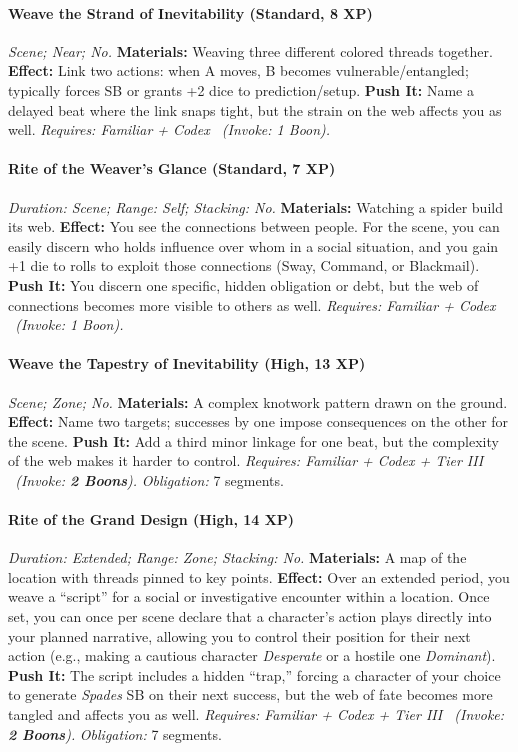 \paragraph{Weave the Strand of Inevitability (Standard, 8 XP)} \emph{Scene; Near; No.}
\textbf{Materials:} Weaving three different colored threads together.
\textbf{Effect:} Link two actions: when A moves, B becomes vulnerable/entangled; typically forces SB or grants +2 dice to prediction/setup.
\textbf{Push It:} Name a delayed beat where the link snaps tight, but the strain on the web affects you as well.
\emph{Requires: Familiar + Codex \ (\textit{Invoke:} 1 Boon).}
\paragraph{Rite of the Weaver's Glance (Standard, 7 XP)} \emph{Duration: Scene; Range: Self; Stacking: No.}
\textbf{Materials:} Watching a spider build its web.
\textbf{Effect:} You see the connections between people. For the scene, you can easily discern who holds influence over whom in a social situation, and you gain +1 die to rolls to exploit those connections (Sway, Command, or Blackmail).
\textbf{Push It:} You discern one specific, hidden obligation or debt, but the web of connections becomes more visible to others as well.
\emph{Requires: Familiar + Codex \ (\textit{Invoke:} 1 Boon).}
\paragraph{Weave the Tapestry of Inevitability (High, 13 XP)} \emph{Scene; Zone; No.}
\textbf{Materials:} A complex knotwork pattern drawn on the ground.
\textbf{Effect:} Name two targets; successes by one impose consequences on the other for the scene.
\textbf{Push It:} Add a third minor linkage for one beat, but the complexity of the web makes it harder to control.
\emph{Requires: Familiar + Codex + Tier III \ (\textit{Invoke:} \textbf{2 Boons}).}
\emph{Obligation:} 7 segments.

\paragraph{Rite of the Grand Design (High, 14 XP)} \emph{Duration: Extended; Range: Zone; Stacking: No.}
\textbf{Materials:} A map of the location with threads pinned to key points.
\textbf{Effect:} Over an extended period, you weave a ``script'' for a social or investigative encounter within a location. Once set, you can once per scene declare that a character's action plays directly into your planned narrative, allowing you to control their position for their next action (e.g., making a cautious character \emph{Desperate} or a hostile one \emph{Dominant}).
\textbf{Push It:} The script includes a hidden ``trap,'' forcing a character of your choice to generate \emph{Spades} SB on their next success, but the web of fate becomes more tangled and affects you as well.
\emph{Requires: Familiar + Codex + Tier III \ (\textit{Invoke:} \textbf{2 Boons}).}
\emph{Obligation:} 7 segments.

